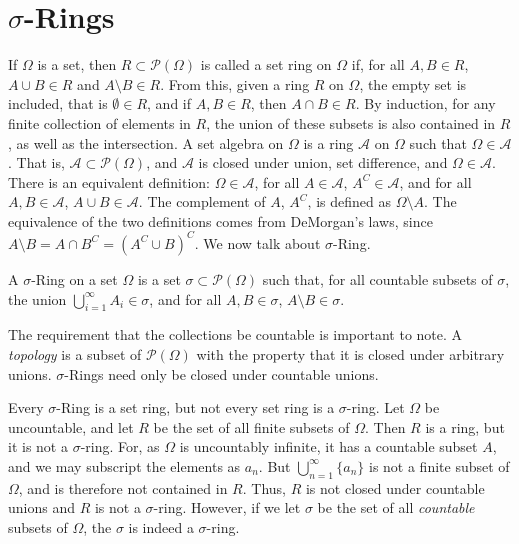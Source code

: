 \section{\texorpdfstring{$\sigma$}{Sigma}-Rings}
    If $\Omega$ is a set, then $R\subset\mathcal{P}(\Omega)$
    is called a set ring on $\Omega$ if, for all
    $A,B\in{R}$, $A\cup{B}\in{R}$ and
    $A\setminus{B}\in{R}$. From this, given a ring $R$ on
    $\Omega$, the empty set is included, that is
    $\emptyset\in{R}$, and if $A,B\in{R}$, then
    $A\cap{B}\in{R}$. By induction, for any finite collection
    of elements in $R$, the union of these subsets is also
    contained in $R$, as well as the intersection. A set
    algebra on $\Omega$ is a ring $\mathcal{A}$
    on $\Omega$ such that $\Omega\in\mathcal{A}$. That is,
    $\mathcal{A}\subset\mathcal{P}(\Omega)$, and
    $\mathcal{A}$ is closed under union, set difference, and
    $\Omega\in\mathcal{A}$. There is an equivalent definition:
    $\Omega\in\mathcal{A}$, for all $A\in\mathcal{A}$,
    $A^{C}\in\mathcal{A}$, and for all $A,B\in\mathcal{A}$,
    $A\cup{B}\in\mathcal{A}$. The complement of $A$,
    $A^{C}$, is defined as $\Omega\setminus{A}$. The
    equivalence of the two definitions comes from DeMorgan's
    laws, since
    $A\setminus{B}=A\cap{B}^{C}=(A^{C}\cup{B})^{C}$. We now
    talk about $\sigma$-Ring.
    \begin{definition}
        A $\sigma$-Ring on a set $\Omega$ is a set
        $\sigma\subset\mathcal{P}(\Omega)$ such that,
        for all countable subsets of $\sigma$, the union
        $\bigcup_{i=1}^{\infty}A_{i}\in\sigma$, and for all
        $A,B\in\sigma$, $A\setminus{B}\in\sigma$.
    \end{definition}
    The requirement that the collections be countable is
    important to note. A \textit{topology} is a subset
    of $\mathcal{P}(\Omega)$ with the property that it is
    closed under arbitrary unions. $\sigma$-Rings need only
    be closed under countable unions.
    \begin{example}
        Every $\sigma$-Ring is a set ring, but not every
        set ring is a $\sigma$-ring. Let $\Omega$ be
        uncountable, and let $R$ be the set of all finite
        subsets of $\Omega$. Then $R$ is a ring, but it is
        not a $\sigma$-ring. For, as $\Omega$ is uncountably
        infinite, it has a countable subset $A$, and we
        may subscript the elements as $a_{n}$. But
        $\bigcup_{n=1}^{\infty}\{a_{n}\}$ is not a finite
        subset of $\Omega$, and is therefore not contained
        in $R$. Thus, $R$ is not closed under countable unions
        and $R$ is not a $\sigma$-ring. However, if we let
        $\sigma$ be the set of all \textit{countable} subsets
        of $\Omega$, the $\sigma$ is indeed a $\sigma$-ring.
    \end{example}
